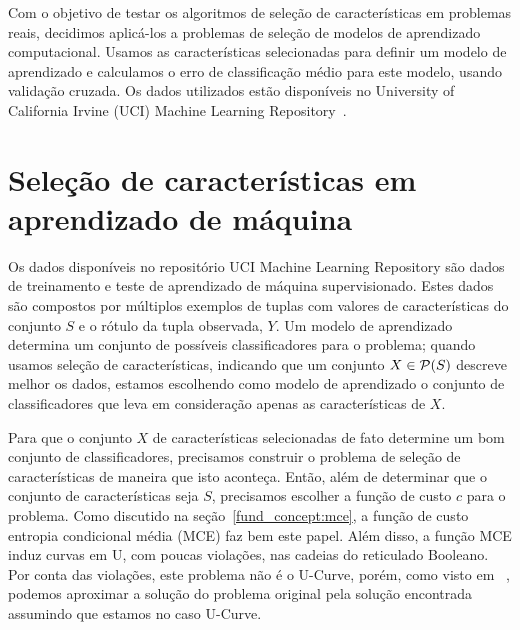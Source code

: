
Com o objetivo de testar os algoritmos de seleção de características
em problemas reais, decidimos aplicá-los a problemas de seleção de 
modelos de aprendizado computacional. Usamos as características 
selecionadas para definir um modelo de aprendizado e calculamos o erro
de classificação médio para este modelo, usando validação cruzada. Os
dados utilizados estão disponíveis no 
University of California Irvine (UCI) Machine Learning 
Repository~\cite{Lic13}.

\section{Seleção de características em aprendizado de máquina}
Os dados disponíveis no repositório UCI Machine Learning Repository
são dados de treinamento e teste de aprendizado de máquina 
supervisionado. Estes dados são compostos por múltiplos exemplos de 
tuplas com valores de características do conjunto $S$ e o rótulo da 
tupla observada, $Y$. Um modelo de aprendizado determina um conjunto de 
possíveis classificadores para o problema; quando usamos seleção de 
características, indicando que um conjunto $X \in \mathcal{P}(S)$ descreve
melhor os dados, estamos escolhendo como modelo de aprendizado o 
conjunto de classificadores que leva em consideração apenas as 
características de $X$.

Para que o conjunto $X$ de características selecionadas de fato 
determine um bom conjunto de classificadores, precisamos construir
o problema de seleção de características de maneira que isto aconteça.
Então, além de determinar que o conjunto de características seja $S$,
precisamos escolher a função de custo $c$ para o problema. 
Como discutido na seção~\ref{fund_concept:mce}, a função de custo
entropia condicional média (MCE) faz bem este papel. Além disso, a 
função MCE induz curvas em U, com poucas violações, nas cadeias do 
reticulado Booleano. Por conta das violações, este problema não é o
U-Curve, porém, como visto em ~\cite{Rei12}, podemos aproximar
a solução do problema original pela solução encontrada assumindo que
estamos no caso U-Curve.

